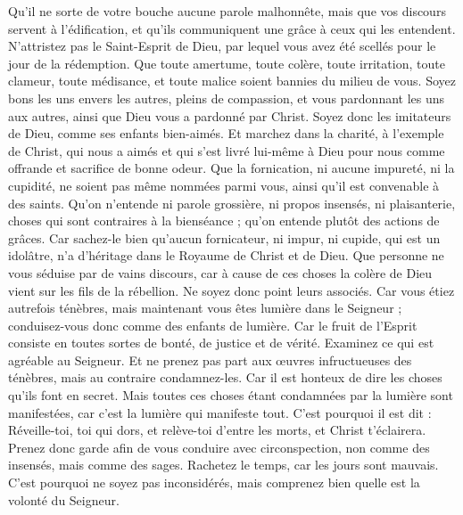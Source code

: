 \begin{multicols}{2}
Qu’il ne sorte de votre bouche aucune parole malhonnête, mais que vos discours servent à l’édification, et qu’ils communiquent une grâce à ceux qui les entendent.
N'attristez pas le Saint-Esprit de Dieu, par lequel vous avez été scellés pour le jour de la rédemption.
Que toute amertume, toute colère, toute irritation, toute clameur, toute médisance, et toute malice soient bannies du milieu de vous.
Soyez bons les uns envers les autres, pleins de compassion, et vous pardonnant les uns aux autres, ainsi que Dieu vous a pardonné par Christ.
\VerseOne{}Soyez donc les imitateurs de Dieu, comme ses enfants bien-aimés.
Et marchez dans la charité, à l’exemple de Christ, qui nous a aimés et qui s'est livré lui-même à Dieu pour nous comme offrande et sacrifice de bonne odeur.
Que la fornication, ni aucune impureté, ni la cupidité, ne soient pas même nommées parmi vous, ainsi qu’il est convenable à des saints.
Qu’on n’entende ni parole grossière, ni propos insensés, ni plaisanterie, choses qui sont contraires à la bienséance ; qu’on entende plutôt des actions de grâces.
Car sachez-le bien qu’aucun fornicateur, ni impur, ni cupide, qui est un idolâtre, n'a d'héritage dans le Royaume de Christ et de Dieu.
Que personne ne vous séduise par de vains discours, car à cause de ces choses la colère de Dieu vient sur les fils de la rébellion.
Ne soyez donc point leurs associés.
Car vous étiez autrefois ténèbres, mais maintenant vous êtes lumière dans le Seigneur ; conduisez-vous donc comme des enfants de lumière.
Car le fruit de l'Esprit consiste en toutes sortes de bonté, de justice et de vérité.
Examinez ce qui est agréable au Seigneur.
Et ne prenez pas part aux œuvres infructueuses des ténèbres, mais au contraire condamnez-les.
Car il est honteux de dire les choses qu'ils font en secret.
Mais toutes ces choses étant condamnées par la lumière sont manifestées, car c’est la lumière qui manifeste tout.
C'est pourquoi il est dit : Réveille-toi, toi qui dors, et relève-toi d'entre les morts, et Christ t'éclairera.
Prenez donc garde afin de vous conduire avec circonspection, non comme des insensés, mais comme des sages.
Rachetez le temps, car les jours sont mauvais.
C'est pourquoi ne soyez pas inconsidérés, mais comprenez bien quelle est la volonté du Seigneur.

\end{multicols}
